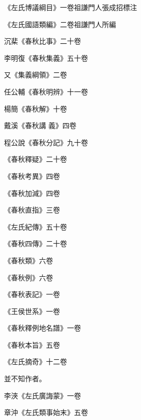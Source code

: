 \begin{pinyinscope}
 《左氏博議綱目》一卷祖謙門人張成招標注



 《左氏國語類編》二卷祖謙門人所編



 沉棐《春秋比事》二十卷



 李明復《春秋集義》五十卷



 又《集義綱領》二卷



 任公輔《春秋明辨》十一卷



 楊簡《春秋解》十卷



 戴溪《春秋講
 義》四卷



 程公說《春秋分記》九十卷



 《春秋釋疑》二十卷



 《春秋考異》四卷



 《春秋加減》四卷



 《春秋直指》三卷



 《左氏紀傳》五十卷



 《春秋四傳》二十卷



 《春秋類》六卷



 《春秋例》六卷



 《春秋表記》一卷



 《王侯世系》一卷



 《春秋釋例地名譜》一卷



 《春秋本旨》五卷



 《左氏摘奇》十二卷



 並不知作者。



 李浹《左氏廣誨蒙》一卷



 章沖《左氏類事始末》五卷




\end{pinyinscope}

